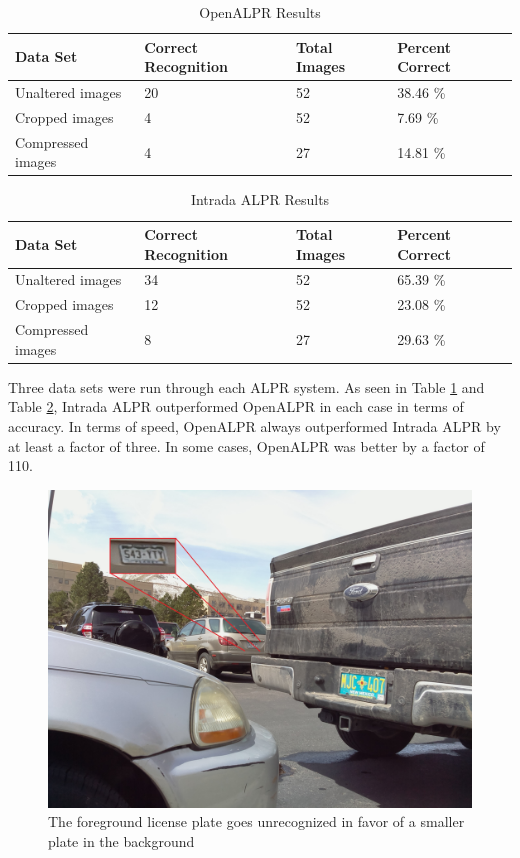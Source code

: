 \documentclass[11pt, oneside, fullpage, doublespace]{article}
\begin{document}
\begin{table}[h!]
\begin{center}
\begin{tabular}{| l || l | l | l |}
\hline
Data Set & Correct Recognition & Total Images & Percent Correct \\ \hline
Unaltered images & 20 & 52 & 38.46 \% \\ \hline
Cropped images & 4 & 52 & 7.69 \% \\ \hline
Compressed images & 4 & 27 & 14.81 \% \\ \hline
\end{tabular}
\end{center}
\caption{OpenALPR Results}
\label{tab:openalprresults}
\end{table}

\begin{table}[h!]
\begin{center}
\begin{tabular}{| l || l | l | l |}
\hline
Data Set & Correct Recognition & Total Images & Percent Correct \\ \hline
Unaltered images & 34 & 52 & 65.39 \% \\ \hline
Cropped images & 12 & 52 & 23.08 \% \\ \hline
Compressed images & 8 & 27 & 29.63 \% \\ \hline
\end{tabular}
\end{center}
\caption{Intrada ALPR Results}
\label{tab:intradaresults}
\end{table}
Three data sets were run through each ALPR system. As seen in Table \ref{tab:openalprresults} and Table \ref{tab:intradaresults}, Intrada ALPR outperformed OpenALPR in each case in terms of accuracy. In terms of speed, OpenALPR always outperformed Intrada ALPR by at least a factor of three. In some cases, OpenALPR was better by a factor of 110.

\begin{figure}
\begin{center}
\includegraphics[width=4.5in]{unexpectedrecognition}
\end{center}
\caption{The foreground license plate goes unrecognized in favor of a smaller plate in the background}
\label{fig:unexpectedrecognition}
\end{figure}
\end{document}

